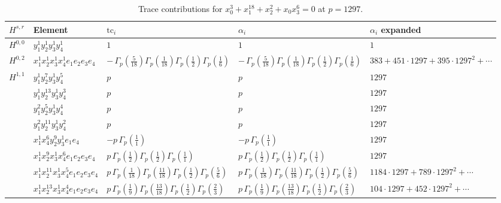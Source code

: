 \documentclass[11pt]{article}
\begin{document}
\begin{table}[ht]
\centering
\caption{Trace contributions for $x_0^{3} + x_1^{18} + x_2^{2} + x_0 x_3^{6} = 0$ at $p=1297$.}\label{tab:deformed-45}
\renewcommand{\arraystretch}{1.1}
{\scriptsize
\begin{tabular}{@{}lllll@{}}
\toprule
$H^{s,r}$ & Element & $\mathrm{tc}_i$ & $\alpha_i$ & $\alpha_i$ expanded \\
\midrule
$H^{0,0}$ & $y_{1}^{1} y_{2}^{1} y_{3}^{1} y_{4}^{1}$ & $1$ & $1$ & $1$ \\
\midrule
$H^{0,2}$ & $x_{1}^{1} x_{2}^{1} x_{3}^{1} x_{4}^{1}  e_{1} e_{2} e_{3} e_{4}$ & $- \, \Gamma_p \left( \frac{5}{18} \right) \Gamma_p \left( \frac{1}{18} \right) \Gamma_p \left( \frac{1}{2} \right) \Gamma_p \left( \frac{1}{6} \right)$ & $- \, \Gamma_p \left( \frac{5}{18} \right) \Gamma_p \left( \frac{1}{18} \right) \Gamma_p \left( \frac{1}{2} \right) \Gamma_p \left( \frac{1}{6} \right)$ & $383{+}451{\cdot}1297{+}395{\cdot}1297^{2}{+}\cdots$ \\
\midrule
$H^{1,1}$ & $y_{1}^{1} y_{2}^{7} y_{3}^{1} y_{4}^{5}$ & $p \,$ & $p \,$ & $1297$ \\
 & $y_{1}^{1} y_{2}^{13} y_{3}^{1} y_{4}^{3}$ & $p \,$ & $p \,$ & $1297$ \\
 & $y_{1}^{2} y_{2}^{5} y_{3}^{1} y_{4}^{4}$ & $p \,$ & $p \,$ & $1297$ \\
 & $y_{1}^{2} y_{2}^{11} y_{3}^{1} y_{4}^{2}$ & $p \,$ & $p \,$ & $1297$ \\
 & $x_{1}^{1} x_{4}^{6} y_{2}^{9} y_{3}^{1} e_{1} e_{4}$ & $- p \, \Gamma_p \left( \frac{1}{1} \right)$ & $- p \, \Gamma_p \left( \frac{1}{1} \right)$ & $1297$ \\
 & $x_{1}^{1} x_{2}^{9} x_{3}^{1} x_{4}^{6}  e_{1} e_{2} e_{3} e_{4}$ & $p \, \Gamma_p \left( \frac{1}{2} \right) \Gamma_p \left( \frac{1}{2} \right) \Gamma_p \left( \frac{1}{1} \right)$ & $p \, \Gamma_p \left( \frac{1}{2} \right) \Gamma_p \left( \frac{1}{2} \right) \Gamma_p \left( \frac{1}{1} \right)$ & $1297$ \\
 & $x_{1}^{1} x_{2}^{11} x_{3}^{1} x_{4}^{5}  e_{1} e_{2} e_{3} e_{4}$ & $p \, \Gamma_p \left( \frac{1}{18} \right) \Gamma_p \left( \frac{11}{18} \right) \Gamma_p \left( \frac{1}{2} \right) \Gamma_p \left( \frac{5}{6} \right)$ & $p \, \Gamma_p \left( \frac{1}{18} \right) \Gamma_p \left( \frac{11}{18} \right) \Gamma_p \left( \frac{1}{2} \right) \Gamma_p \left( \frac{5}{6} \right)$ & $1184{\cdot}1297{+}789{\cdot}1297^{2}{+}\cdots$ \\
 & $x_{1}^{1} x_{2}^{13} x_{3}^{1} x_{4}^{4}  e_{1} e_{2} e_{3} e_{4}$ & $p \, \Gamma_p \left( \frac{1}{9} \right) \Gamma_p \left( \frac{13}{18} \right) \Gamma_p \left( \frac{1}{2} \right) \Gamma_p \left( \frac{2}{3} \right)$ & $p \, \Gamma_p \left( \frac{1}{9} \right) \Gamma_p \left( \frac{13}{18} \right) \Gamma_p \left( \frac{1}{2} \right) \Gamma_p \left( \frac{2}{3} \right)$ & $104{\cdot}1297{+}452{\cdot}1297^{2}{+}\cdots$ \\

\end{tabular}}
\end{table}
\end{document}
